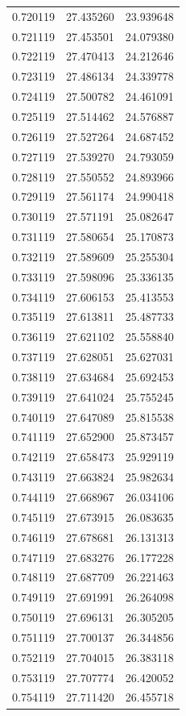 \begin{tabular}{rrr}
0.720119 & 27.435260 & 23.939648 \\
0.721119 & 27.453501 & 24.079380 \\
0.722119 & 27.470413 & 24.212646 \\
0.723119 & 27.486134 & 24.339778 \\
0.724119 & 27.500782 & 24.461091 \\
0.725119 & 27.514462 & 24.576887 \\
0.726119 & 27.527264 & 24.687452 \\
0.727119 & 27.539270 & 24.793059 \\
0.728119 & 27.550552 & 24.893966 \\
0.729119 & 27.561174 & 24.990418 \\
0.730119 & 27.571191 & 25.082647 \\
0.731119 & 27.580654 & 25.170873 \\
0.732119 & 27.589609 & 25.255304 \\
0.733119 & 27.598096 & 25.336135 \\
0.734119 & 27.606153 & 25.413553 \\
0.735119 & 27.613811 & 25.487733 \\
0.736119 & 27.621102 & 25.558840 \\
0.737119 & 27.628051 & 25.627031 \\
0.738119 & 27.634684 & 25.692453 \\
0.739119 & 27.641024 & 25.755245 \\
0.740119 & 27.647089 & 25.815538 \\
0.741119 & 27.652900 & 25.873457 \\
0.742119 & 27.658473 & 25.929119 \\
0.743119 & 27.663824 & 25.982634 \\
0.744119 & 27.668967 & 26.034106 \\
0.745119 & 27.673915 & 26.083635 \\
0.746119 & 27.678681 & 26.131313 \\
0.747119 & 27.683276 & 26.177228 \\
0.748119 & 27.687709 & 26.221463 \\
0.749119 & 27.691991 & 26.264098 \\
0.750119 & 27.696131 & 26.305205 \\
0.751119 & 27.700137 & 26.344856 \\
0.752119 & 27.704015 & 26.383118 \\
0.753119 & 27.707774 & 26.420052 \\
0.754119 & 27.711420 & 26.455718 \\

\end{tabular}
